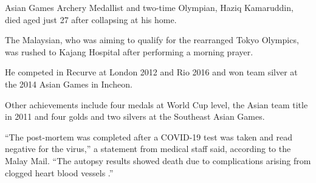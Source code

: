 Asian Games Archery Medallist and two-time Olympian, Haziq Kamaruddin, died aged
just 27 after collapsing at his home.

The Malaysian, who was aiming to qualify for the rearranged Tokyo Olympics, was
rushed to Kajang Hospital after performing a morning prayer.

He competed in Recurve at London 2012 and Rio 2016 and won team silver at the
2014 Asian Games in Incheon.

Other achievements include four medals at World Cup level, the Asian team title
in 2011 and four golds and two silvers at the Southeast Asian Games.

“The post-mortem was completed after a COVID-19 test was taken and read negative
for the virus,” a statement from medical staff said, according to the Malay
Mail. “The autopsy results showed death due to complications arising from
clogged heart blood vessels .”
